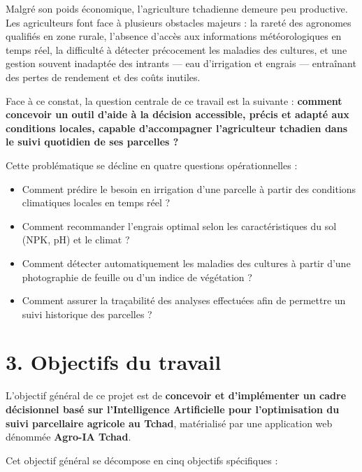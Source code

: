Malgré son poids économique, l'agriculture tchadienne demeure peu
productive. Les agriculteurs font face à plusieurs obstacles
majeurs : la rareté des agronomes qualifiés en zone rurale,
l'absence d'accès aux informations météorologiques en temps réel,
la difficulté à détecter précocement les maladies des cultures,
et une gestion souvent inadaptée des intrants --- eau d'irrigation
et engrais --- entraînant des pertes de rendement et des coûts
inutiles.

\medskip

Face à ce constat, la question centrale de ce travail est la
suivante : \textbf{comment concevoir un outil d'aide à la décision
	accessible, précis et adapté aux conditions locales, capable
	d'accompagner l'agriculteur tchadien dans le suivi quotidien de
	ses parcelles ?}

\medskip

Cette problématique se décline en quatre questions opérationnelles :

\begin{itemize}[leftmargin=1.2cm]
	\item Comment prédire le besoin en irrigation d'une parcelle à
	partir des conditions climatiques locales en temps réel ?
	\item Comment recommander l'engrais optimal selon les
	caractéristiques du sol (NPK, pH) et le climat ?
	\item Comment détecter automatiquement les maladies des cultures
	à partir d'une photographie de feuille ou d'un indice de
	végétation ?
	\item Comment assurer la traçabilité des analyses effectuées
	afin de permettre un suivi historique des parcelles ?
\end{itemize}

\section*{3. Objectifs du travail}

L'objectif général de ce projet est de \textbf{concevoir et
	d'implémenter un cadre décisionnel basé sur l'Intelligence
	Artificielle pour l'optimisation du suivi parcellaire agricole au
	Tchad}, matérialisé par une application web dénommée
\textbf{Agro-IA Tchad}.

\medskip

Cet objectif général se décompose en cinq objectifs spécifiques :

